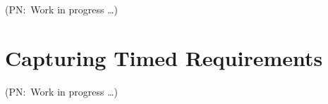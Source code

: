 \documentclass[journal]{IEEEtran}
\newcommand{\pierluigi}[1]{{\normalsize{{{\color{blue}(PN:\ #1)}}}}}
\begin{document}
\begin{itemize}
\end{itemize}

\pierluigi{Work in progress \ldots}

\section{Capturing Timed Requirements}

\pierluigi{Work in progress \ldots}
\end{document}
